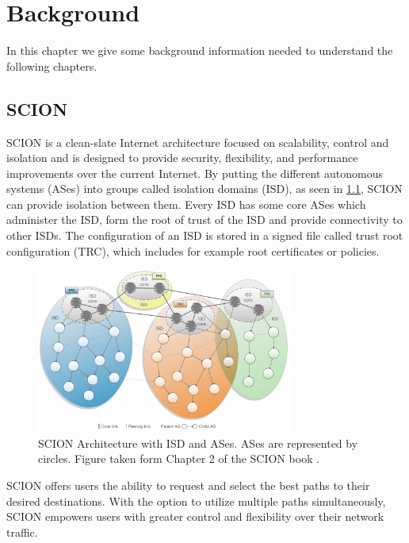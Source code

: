 \chapter{Background}
\label{ch:background}

In this chapter we give some background information needed to understand the following chapters.


\section{SCION}

SCION \cite{Perrig2022} is a clean-slate Internet architecture focused on scalability, control and isolation and is designed to provide security, flexibility, and performance improvements over the current Internet.
By putting the different autonomous systems (ASes) into groups called isolation domains (ISD), as seen in \cref{fig:scion_isd_architecture}, SCION can provide isolation between them.
Every ISD has some core ASes which administer the ISD, form the root of trust of the ISD and provide connectivity to other ISDs.
The configuration of an ISD is stored in a signed file called trust root configuration (TRC), which includes for example root certificates or policies.

\begin{figure}
    \centering
    \includegraphics[width=0.75\textwidth]{figures/scion_isd_architecture.png}
    \caption{SCION Architecture with ISD and ASes. ASes are represented by circles. Figure taken form Chapter 2 of the SCION book \cite{Perrig2022}.}
    \label{fig:scion_isd_architecture}
\end{figure}

SCION offers users the ability to request and select the best paths to their desired destinations.
With the option to utilize multiple paths simultaneously, SCION empowers users with greater control and flexibility over their network traffic.







